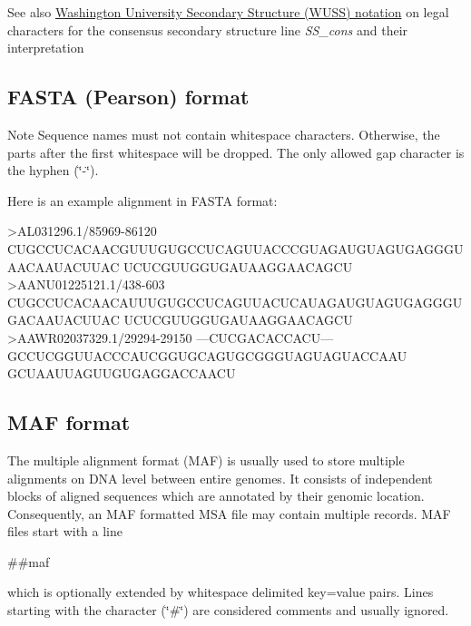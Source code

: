 \begin{DoxySeeAlso}{See also}
\hyperlink{rna_structure_notations_wuss-notation}{Washington University Secondary Structure (W\+U\+SS) notation} on legal characters for the consensus secondary structure line {\itshape S\+S\+\_\+cons} and their interpretation
\end{DoxySeeAlso}
\hypertarget{file_formats_msa-formats-fasta}{}\subsection{F\+A\+S\+T\+A (\+Pearson) format}\label{file_formats_msa-formats-fasta}
\begin{DoxyNote}{Note}
Sequence names must not contain whitespace characters. Otherwise, the parts after the first whitespace will be dropped. The only allowed gap character is the hyphen {\itshape }(\char`\"{}-\/\char`\"{}).
\end{DoxyNote}
Here is an example alignment in F\+A\+S\+TA format\+: \begin{DoxyVerb}>AL031296.1/85969-86120
CUGCCUCACAACGUUUGUGCCUCAGUUACCCGUAGAUGUAGUGAGGGUAACAAUACUUAC
UCUCGUUGGUGAUAAGGAACAGCU
>AANU01225121.1/438-603
CUGCCUCACAACAUUUGUGCCUCAGUUACUCAUAGAUGUAGUGAGGGUGACAAUACUUAC
UCUCGUUGGUGAUAAGGAACAGCU
>AAWR02037329.1/29294-29150
---CUCGACACCACU---GCCUCGGUUACCCAUCGGUGCAGUGCGGGUAGUAGUACCAAU
GCUAAUUAGUUGUGAGGACCAACU\end{DoxyVerb}
\hypertarget{file_formats_msa-formats-maf}{}\subsection{M\+A\+F format}\label{file_formats_msa-formats-maf}
The multiple alignment format (M\+AF) is usually used to store multiple alignments on D\+NA level between entire genomes. It consists of independent blocks of aligned sequences which are annotated by their genomic location. Consequently, an M\+AF formatted M\+SA file may contain multiple records. M\+AF files start with a line \begin{DoxyVerb}##maf
\end{DoxyVerb}
 which is optionally extended by whitespace delimited key=value pairs. Lines starting with the character (\char`\"{}\#\char`\"{}) are considered comments and usually ignored.

